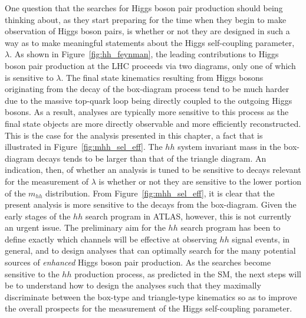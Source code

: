 One question that the searches for Higgs boson pair production should being thinking about,
as they start preparing for the time when they begin to make observation of Higgs boson pairs,
is whether or not they are designed in such a way as to make meaningful statements about the
Higgs self-coupling parameter, $\lambda$.
As shown in Figure~\ref{fig:hh_feynman}, the leading contributions to Higgs boson pair production
at the LHC proceeds via two diagrams, only one of which is sensitive to $\lambda$.
The final state kinematics resulting from Higgs bosons originating from the decay of the box-diagram
process tend to be much harder due to the massive top-quark loop being directly coupled to the outgoing Higgs bosons.
As a result, analyses are typically more sensitive to this process as the final state objects are
more directly observable and more efficiently reconstructed.
This is the case for the analysis presented in this chapter, a fact that is illustrated in Figure~\ref{fig:mhh_sel_eff}.
The $hh$ system invariant mass in the box-diagram decays
tends to be larger than that of the triangle diagram.
An indication, then, of whether an analysis is tuned to be sensitive to decays relevant
for the measurement of $\lambda$ is whether or not they are sensitive to the lower portion of the $m_{hh}$ distribution.
From Figure~\ref{fig:mhh_sel_eff}, it is clear that the present analysis is more sensitive to the decays from the box-diagram.
Given the early stages of the $hh$ search program in ATLAS, however, this is not currently
an urgent issue.
The preliminary aim for the $hh$ search program has been to define exactly which channels will be effective
at observing $hh$ signal events, in general, and to design analyses that can optimally search
for the many potential sources of \textit{enhanced} Higgs boson pair production.
As the searches become sensitive to the $hh$ production process, as predicted in the SM,
the next steps will be to understand how to design the analyses such that they maximally
discriminate between the box-type and triangle-type kinematics so as to improve the overall prospects
for the measurement of the Higgs self-coupling parameter.

